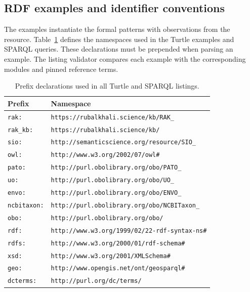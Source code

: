 \begin{revision}
\subsection{RDF examples and identifier conventions}\label{methods:graph_examples}

The examples instantiate the formal patterns with observations
from the resource. Table~\ref{tab:prefixes} defines the namespaces used
in the Turtle examples and SPARQL queries. These declarations must be prepended when parsing an example. The listing validator compares each example
with the corresponding modules and pinned reference terms.

\begin{table}[h]
\centering
\caption{Prefix declarations used in all Turtle and SPARQL listings.}
\label{tab:prefixes}
\small
\begin{tabular}{ll}
\toprule
\textbf{Prefix} & \textbf{Namespace} \\
\midrule
\texttt{rak:}      & \texttt{https://rubalkhali.science/kb/RAK\_} \\
\texttt{rak\_kb:}  & \texttt{https://rubalkhali.science/kb/} \\
\texttt{sio:}      & \texttt{http://semanticscience.org/resource/SIO\_} \\
\texttt{owl:}      & \texttt{http://www.w3.org/2002/07/owl\#} \\
\texttt{pato:}     & \texttt{http://purl.obolibrary.org/obo/PATO\_} \\
\texttt{uo:}       & \texttt{http://purl.obolibrary.org/obo/UO\_} \\
\texttt{envo:}     & \texttt{http://purl.obolibrary.org/obo/ENVO\_} \\
\texttt{ncbitaxon:}& \texttt{http://purl.obolibrary.org/obo/NCBITaxon\_} \\
\texttt{obo:}      & \texttt{http://purl.obolibrary.org/obo/} \\
\texttt{rdf:}      & \texttt{http://www.w3.org/1999/02/22-rdf-syntax-ns\#} \\
\texttt{rdfs:}     & \texttt{http://www.w3.org/2000/01/rdf-schema\#} \\
\texttt{xsd:}      & \texttt{http://www.w3.org/2001/XMLSchema\#} \\
\texttt{geo:}      & \texttt{http://www.opengis.net/ont/geosparql\#} \\
\texttt{dcterms:}  & \texttt{http://purl.org/dc/terms/} \\
\bottomrule
\end{tabular}
\end{table}


\end{revision}
